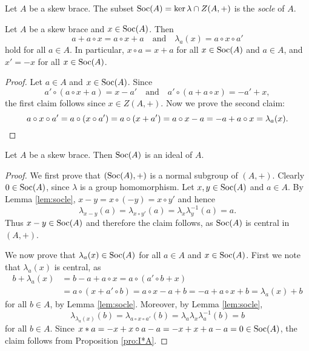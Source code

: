\begin{definition}
	Let $A$ be a skew brace. The subset 
	$\operatorname{Soc}(A)=\ker\lambda\cap Z(A,+)$
	is the \emph{socle} of $A$.
\end{definition}

\begin{lemma}
    \label{lem:socle}
    Let $A$ be a skew brace and $x\in\operatorname{Soc}(A)$. Then 
    \[
    a+a\circ x=a\circ x+a\quad\text{and}\quad
    \lambda_a(x)=a\circ x\circ a'
    \]
    hold 
    for all $a\in A$. In particular, $x\circ a=x+a$ 
    for all $x\in\operatorname{Soc}(A)$ and $a\in A$, 
    and
    $x'=-x$ for all $x\in\operatorname{Soc}(A)$.
\end{lemma}

\begin{proof}
    Let $a\in A$ and $x\in\operatorname{Soc}(A)$. Since
    \[
    a'\circ (a\circ x+a)=x-a'\quad\text{and}\quad
    a'\circ (a+a\circ x)=-a'+x,
    \]
    the first claim follows since
    $x\in Z(A,+)$.
    Now we prove the second claim:
    \[
    a\circ x\circ a'=a\circ (x\circ a')=a\circ (x+a')=a\circ x-a=-a+a\circ
    x=\lambda_a(x).\qedhere
    \]
\end{proof}

\begin{proposition}
	\label{pro:socle}
	Let $A$ be a skew brace. Then $\operatorname{Soc}(A)$ is an ideal of $A$.
	\end{proposition}

	\begin{proof}
		We first prove that $(\operatorname{Soc}(A),+)$ is 
		a normal subgroup of $(A,+)$. 
		Clearly $0\in\operatorname{Soc}(A)$, since $\lambda$ is a group homomorphism. Let $x,y\in\operatorname{Soc}(A)$ and $a\in A$.  
		By Lemma \ref{lem:socle}, 
		$x-y=x\circ(-y)=x\circ y'$ and hence 
		\[
		\lambda_{x-y}(a)=\lambda_{x\circ y'}(a)=\lambda_x\lambda^{-1}_y(a)=a.
		\]
		Thus $x-y\in\operatorname{Soc}(A)$ and therefore the claim follows, as 
		$\operatorname{Soc}(A)$ is central in $(A,+)$.
		
		
		We now prove that $\lambda_a(x)\in\operatorname{Soc}(A)$ for all $a\in A$ and $x\in\operatorname{Soc}(A)$. 
		First we note that $\lambda_a(x)$ is central, as
	    \begin{align*}
	        b+\lambda_a(x)&=b-a+a\circ x=a\circ (a'\circ b+x)\\
	        &=a\circ (x+a'\circ b)=a\circ x-a+b
	        =-a+a\circ x+b=\lambda_a(x)+b
	    \end{align*} 	
	    for all $b\in A$, by Lemma \ref{lem:socle}. Moreover, 
	    by Lemma \ref{lem:socle},
	    \[
	    \lambda_{\lambda_a(x)}(b)=\lambda_{a\circ x\circ a'}(b)
	    =\lambda_a\lambda_x\lambda^{-1}_a(b)=b
	    \]
	    for all $b\in A$. Since $x*a=-x+x\circ a-a=-x+x+a-a=0\in\operatorname{Soc}(A)$, 
	    the claim follows from Proposition \ref{pro:I*A}.
	\end{proof}

